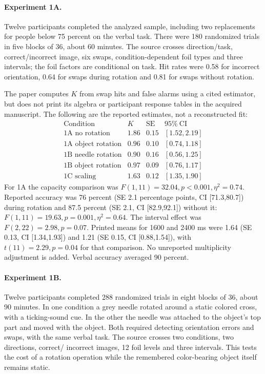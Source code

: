 \paragraph{Experiment 1A.}
Twelve participants completed the analyzed sample, including two
replacements for people below 75 percent on the verbal task.
There were 180 randomized trials in five blocks of 36, about
60 minutes. The source crosses direction/task, correct/incorrect
image, six swaps, condition-dependent foil types and three
intervals; the foil factors are conditional on task.
Hit rates were 0.58 for incorrect orientation, 0.64 for swaps
during rotation and 0.81 for swaps without rotation.

The paper computes \(K\) from swap hits and false alarms using
a cited estimator, but does not print its algebra or participant
response tables in the acquired manuscript. The following are
the reported estimates, not a reconstructed fit:
\[
\begin{array}{l|rrl}
\text{Condition}&K&\mathrm{SE}&95\%\ \mathrm{CI}\\\hline
\text{1A no rotation}&1.86&0.15&[1.52,2.19]\\
\text{1A object rotation}&0.96&0.10&[0.74,1.18]\\
\text{1B needle rotation}&0.90&0.16&[0.56,1.25]\\
\text{1B object rotation}&0.97&0.09&[0.76,1.17]\\
\text{1C scaling}&1.63&0.12&[1.35,1.90]
\end{array}
\]
For 1A the capacity comparison was
\(F(1,11)=32.04,p<0.001,\eta^2=0.74\).
Reported accuracy was 76 percent (SE 2.1 percentage points,
CI [71.3,80.7]) during rotation and 87.5 percent
(SE 2.1, CI [82.9,92.1]) without it:
\(F(1,11)=19.63,p=0.001,\eta^2=0.64\).
The interval effect was \(F(2,22)=2.98,p=0.07\).
Printed means for 1600 and 2400 ms were 1.64
(SE 0.13, CI [1.34,1.93]) and 1.21
(SE 0.15, CI [0.88,1.54]), with
\(t(11)=2.29,p=0.04\) for that comparison.
No unreported multiplicity adjustment is added.
Verbal accuracy averaged 90 percent.

\paragraph{Experiment 1B.}
Twelve participants completed 288 randomized trials in eight
blocks of 36, about 90 minutes. In one condition a grey needle
rotated around a static colored cross, with a ticking-sound cue.
In the other the needle was attached to the object's top part
and moved with the object. Both required detecting orientation
errors and swaps, with the same verbal task.
The source crosses two conditions, two directions, correct/
incorrect images, 12 foil levels and three intervals.
This tests the cost of a rotation operation while the remembered
color-bearing object itself remains static.


